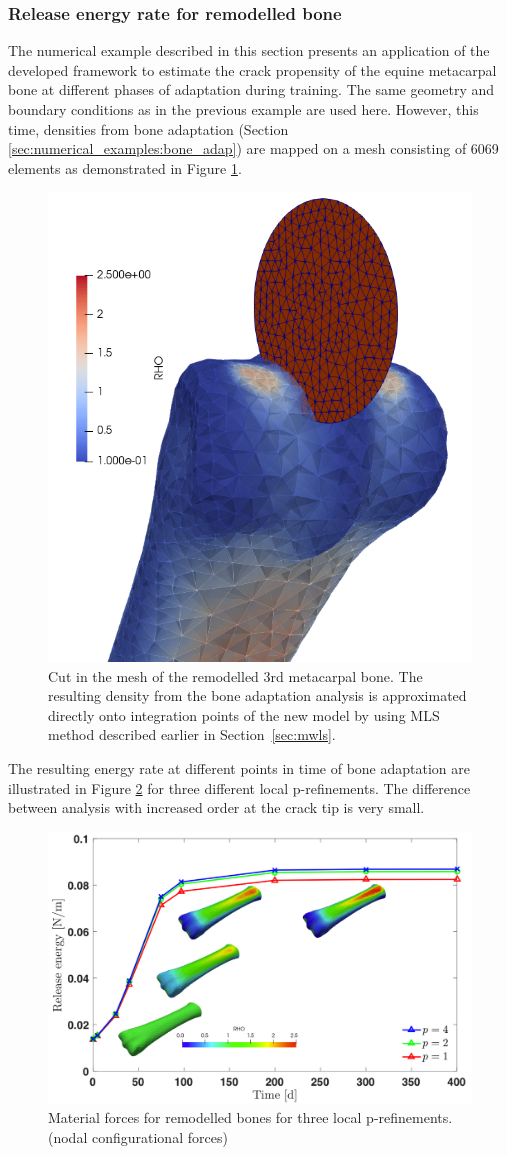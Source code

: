 \documentclass[11pt]{acmeArticle}
\numberwithin{equation}{section}
\begin{document}
\subsubsection{Release energy rate for remodelled bone}
The numerical example described in this section presents an application of the developed framework to estimate the crack propensity of the equine metacarpal bone at different phases of adaptation during training. The same geometry and boundary conditions as in the previous example are used here. However, this time, densities from bone adaptation (Section \ref{sec:numerical_examples:bone_adap}) are mapped on a mesh consisting of 6069 elements as demonstrated in Figure \ref{fig:frackmeshcutting}. 
\begin{figure}
	\centering
	\includegraphics[width=0.4\linewidth]{Figures/frack_mesh_cutting.png}
	\caption{Cut in the mesh of the remodelled 3rd metacarpal bone. The resulting density from the bone adaptation analysis is approximated directly onto integration points of the new model by using MLS method described earlier in Section~\ref{sec:mwls}. }
	\label{fig:frackmeshcutting}
\end{figure}
The resulting energy rate at different points in time of bone adaptation are illustrated in Figure \ref{fig:crackmc3release} for three different local p-refinements. The difference between analysis with increased order at the crack tip is very small. 
\begin{figure}
	\centering
	\includegraphics[width=1\linewidth]{Figures/graphs/crack_mc3_release.png}
	\caption{Material forces for remodelled bones for three local p-refinements. (nodal configurational forces)}
	\label{fig:crackmc3release}
\end{figure}
\end{document}
